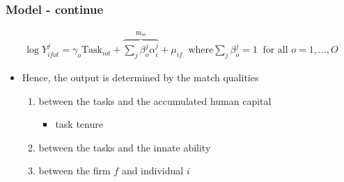 \documentclass[10pt,svgnames,fragile]{beamer}
\begin{document}
\begin{frame}
\frametitle{Model - continue}
\begin{align}
	\log{Y_{ifot}^j} = \gamma_o{\text{Task}_{iot}} +{\overbrace{\sum_j \beta_{o}^j \alpha_{i}^j }^{\text{m}_{io}}}+\mu_{if} \;\;\text{where} \sum_{j} \beta_{o}^j = 1 \;\;\text{for all }o=1,...,O 
\end{align}
\begin{itemize}
	\vspace{3 mm}
	\item Hence, the output is determined by the match qualities
	\begin{enumerate}
		\vspace{1 mm}
		\item between the tasks and the accumulated human capital
		\begin{itemize}
			\item task tenure
		\end{itemize}
		\vspace{1 mm}
		\item  between the tasks and  the innate ability
		\vspace{1 mm}
		\item between the firm $f$ and individual $i$
	\end{enumerate}
\end{itemize}
\end{frame}
\end{document}
